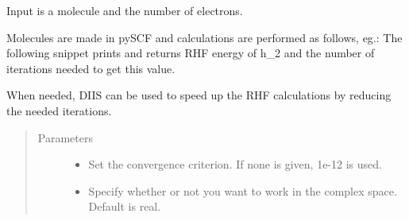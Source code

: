 \documentclass[letterpaper,10pt,english]{sphinxmanual}
\begin{document}
\begin{fulllineitems}
\label{\detokenize{RHF:hf.RHF.RHF}}
Input is a molecule and the number of electrons.

Molecules are made in pySCF and calculations are performed as follows, eg.:
The following snippet prints and returns RHF energy of h\_2
and the number of iterations needed to get this value.

\begin{sphinxVerbatim}[commandchars=\\\{\}]
          
   
\end{sphinxVerbatim}

\begin{fulllineitems}
\label{\detokenize{RHF:hf.RHF.RHF.diis}}
When needed, DIIS can be used to speed up the RHF calculations by reducing the needed iterations.
\begin{quote}\begin{description}
\item[{Parameters}] \leavevmode\begin{itemize}
\item {} 
 \textendash{} Set the convergence criterion. If none is given, 1e-12 is used.

\item {} 
 \textendash{} Specify whether or not you want to work in the complex space. Default is real.


\end{itemize}
\end{description}
\end{quote}
\end{fulllineitems}
\end{fulllineitems}
\end{document}
